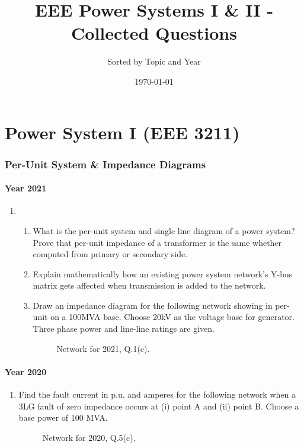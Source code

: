 \documentclass[12pt, a4paper]{article}
\title{EEE Power Systems I \& II - Collected Questions}
\author{Sorted by Topic and Year}
\date{\today}
\begin{document}
	\maketitle
	\tableofcontents
	\newpage
	
	
	\part{Power System I (EEE 3211)}
	
	\section{Per-Unit System \& Impedance Diagrams}
	
	\subsection{Year 2021}
	\begin{enumerate}[label=\textbf{Q\arabic*.}, wide, labelindent=0pt]
		\item
		\begin{enumerate}[label=\textbf{(\alph*)}]
			\item What is the per-unit system and single line diagram of a power system? Prove that per-unit impedance of a transformer is the same whether computed from primary or secondary side.
			\item Explain mathematically how an existing power system network's Y-bus matrix gets affected when transmission is added to the network.
			\item Draw an impedance diagram for the following network showing in per-unit on a 100MVA base. Choose 20kV as the voltage base for generator. Three phase power and line-line ratings are given.
			\begin{figure}[h!]
				\centering
				\caption{Network for 2021, Q.1(c).}
			\end{figure}
		\end{enumerate}
	\end{enumerate}
	
	\subsection{Year 2020}
	\begin{enumerate}[label=\textbf{Q.5.(c)}, wide, labelindent=0pt]
		\item Find the fault current in p.u. and amperes for the following network when a 3LG fault of zero impedance occurs at (i) point A and (ii) point B. Choose a base power of 100 MVA.
		\begin{figure}[h!]
			\centering
			\caption{Network for 2020, Q.5(c).}
		\end{figure}
	\end{enumerate}
	
\end{document}
